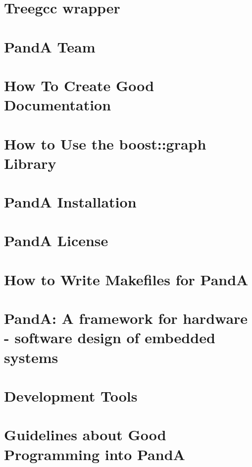 \documentclass[a4paper]{book}
\begin{document}
\chapter{Treegcc wrapper}
\label{src_wrapper_treegcc}

\chapter{PandA Team}
\label{panda_authors}

\chapter{How To Create Good Documentation}
\label{documentation_how_to}

\chapter{How to Use the boost\+:\+:graph Library}
\label{graphs_how_to}

\chapter{PandA Installation}
\label{panda_install}

\chapter{PandA License}
\label{panda_license}

\chapter{How to Write Makefiles for PandA}
\label{makefiles_how_to}

\chapter{PandA\+: A framework for hardware -\/ software design of embedded systems}
\label{PandA_DOC}

\chapter{Development Tools}
\label{panda_sdk}

\chapter{Guidelines about Good Programming into PandA}
\label{programming_style}

\end{document}
